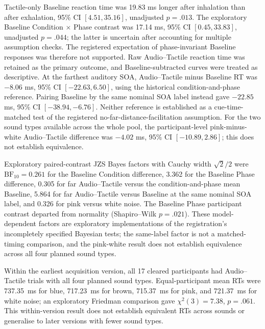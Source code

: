 Tactile-only Baseline reaction time was 19.83 ms longer after inhalation than after exhalation, 95\% CI $[4.51, 35.16]$, unadjusted $p=.013$. The exploratory Baseline Condition $\times$ Phase contrast was 17.14 ms, 95\% CI $[0.45, 33.83]$, unadjusted $p=.044$; the latter is uncertain after accounting for multiple assumption checks. The registered expectation of phase-invariant Baseline responses was therefore not supported. Raw Audio--Tactile reaction time was retained as the primary outcome, and Baseline-subtracted curves were treated as descriptive. At the farthest auditory SOA, Audio--Tactile minus Baseline RT was $-8.06$ ms, 95\% CI $[-22.63, 6.50]$, using the historical condition-and-phase reference. Pairing Baseline by the same nominal SOA label instead gave $-22.85$ ms, 95\% CI $[-38.94, -6.76]$. Neither reference is established as a cue-time-matched test of the registered no-far-distance-facilitation assumption. For the two sound types available across the whole pool, the participant-level pink-minus-white Audio--Tactile difference was $-4.02$ ms, 95\% CI $[-10.89, 2.86]$; this does not establish equivalence.

Exploratory paired-contrast JZS Bayes factors with Cauchy width $\sqrt{2}/2$ were $\mathrm{BF}_{10}=0.261$ for the Baseline Condition difference, 3.362 for the Baseline Phase difference, 0.305 for far Audio--Tactile versus the condition-and-phase mean Baseline, 5.864 for far Audio--Tactile versus Baseline at the same nominal SOA label, and 0.326 for pink versus white noise. The Baseline Phase participant contrast departed from normality (Shapiro--Wilk $p=.021$). These model-dependent factors are exploratory implementations of the registration's incompletely specified Bayesian tests; the same-label factor is not a matched-timing comparison, and the pink-white result does not establish equivalence across all four planned sound types.

Within the earliest acquisition version, all 17 cleared participants had Audio--Tactile trials with all four planned sound types. Equal-participant mean RTs were 737.35~ms for blue, 717.23~ms for brown, 715.37~ms for pink, and 721.37~ms for white noise; an exploratory Friedman comparison gave $\chi^{2}(3)=7.38$, $p=.061$. This within-version result does not establish equivalent RTs across sounds or generalise to later versions with fewer sound types.

